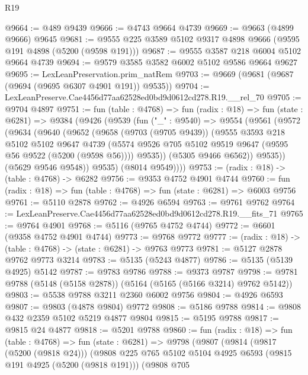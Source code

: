 \begin{lexlean}{R19}
\begin{coremodule}
{{{{{{{{{{{@9664 := @489 @9439
@9666 := @4743 @9664 @4739
@9669 := @9663 (@4899 @9666) @9645
@9681 := @9555 @225 @3589 @5102 @9317 @4898 @9666 (@9595 @191 @4898 (@5200 (@9598 @191)))
@9687 := @9555 @3587 @218 @6004 @5102 @9664 @4739
@9694 := @9579 @3585 @3582 @6002 @5102 @9586 @9664 @9627
@9695 := LexLeanPreservation.prim_natRem
@9703 := @9669 (@9681 (@9687 (@9694 (@9695 @6307 @4901 @191)) @9535))
@9704 := LexLeanPreserve.Cae4456d77aa62528ed0bd9d0612cd278.R19.__rel_70
@9705 := @9704 @4897
@9751 := fun (table : @4768) =>
  fun (radix : @18) =>
  fun (state : @6281) =>
  @9384
    (@9426
      (@9539
        (fun ("_" : @9540) =>
        @9554
          (@9561
            (@9572
              (@9634
                (@9640
                  (@9652
                    (@9658
                      (@9703 (@9705 @9439))
                      (@9555
                        @3593
                        @218
                        @5102
                        @5102
                        @9647
                        @4739
                        (@5574 @9526 @705 @5102 @9519 @9647 (@9595 @56 @9522 (@5200 (@9598 @56))))
                        @9535))
                    (@5305 @9466 @6562))
                  @9535))
              (@5629 @9546 @9548))
            @9535)
          (@8014 @9549))))
@9753 := (radix : @18) -> (table : @4768) -> @6282
@9756 := @9353 @4752 @4901 @4744
@9760 := fun (radix : @18) => fun (table : @4768) => fun (state : @6281) => @6003 @9756
@9761 := @5110 @2878
@9762 := @4926 @6594
@9763 := @9761 @9762
@9764 := LexLeanPreserve.Cae4456d77aa62528ed0bd9d0612cd278.R19.__fits_71
@9765 := @9764 @4901
@9768 := @5116 (@9765 @4752 @4744)
@9772 := @6601 (@9358 @4752 @4901 @4744)
@9773 := @9768 @9772
@9777 := (radix : @18) -> (table : @4768) -> (state : @6281) -> @9763 @9773
@9781 := @5127 @2878 @9762 @9773 @3214
@9783 := @5135 (@5243 @4877)
@9786 := @5135 (@5139 @4925) @5142
@9787 := @9783 @9786
@9788 := @9373 @9787
@9798 := @9781 @9788 (@5148 (@5158 @2878)) (@5164 (@5165 (@5166 @3214) @9762 @5142))
@9803 := @5538 @9788 @3211 @2360 @6002 @9756
@9804 := @4926 @6593
@9807 := @9803 (@4878 @9804) @9772
@9808 := @5186 @9788
@9814 := @9808 @432 @2359 @5102 @5219 @4877 @9804
@9815 := @5195 @9788
@9817 := @9815 @24 @4877
@9818 := @5201 @9788
@9860 := fun (radix : @18) =>
  fun (table : @4768) =>
  fun (state : @6281) =>
  @9798
    (@9807
      (@9814
        (@9817 (@5200 (@9818 @24)))
        (@9808
          @225
          @765
          @5102
          @5104
          @4925
          @6593
          (@9815 @191 @4925 (@5200 (@9818 @191)))
          (@9808
            @705
}}}}}}}}}}}
\end{coremodule}
\end{lexlean}
